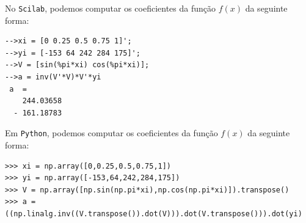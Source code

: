 \begin{sol}
\ifisscilab
No \verb+Scilab+, podemos computar os coeficientes da função $f(x)$ da seguinte forma:
\begin{verbatim}
-->xi = [0 0.25 0.5 0.75 1]';  
-->yi = [-153 64 242 284 175]'; 
-->V = [sin(%pi*xi) cos(%pi*xi)]; 
-->a = inv(V'*V)*V'*yi 
 a  =
    244.03658  
  - 161.18783  
\end{verbatim}
\fi
\ifispython
Em \verb+Python+, podemos computar os coeficientes da função $f(x)$ da seguinte forma:
\begin{verbatim}
>>> xi = np.array([0,0.25,0.5,0.75,1])
>>> yi = np.array([-153,64,242,284,175])
>>> V = np.array([np.sin(np.pi*xi),np.cos(np.pi*xi)]).transpose()
>>> a = ((np.linalg.inv((V.transpose()).dot(V))).dot(V.transpose())).dot(yi)
\end{verbatim}
\fi

\end{sol}

